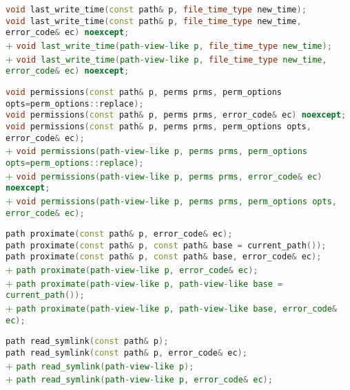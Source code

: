 \documentclass[11pt]{article}
\newcommand{\code}[2][cpp]{\lstinline[language=#1,basicstyle=\small\ttfamily]{#2}}
\newcommand{\tsreplace}[3]{\textcolor{red}{\sout{#1}}#2\textcolor{darkgreen}{#3}}
\begin{document}
\tsreplace{}{  \code{void last_write_time(const path& p, file_time_type new_time);}}{}\\
\tsreplace{}{  \code{void last_write_time(const path& p, file_time_type new_time, error_code& ec) noexcept;}}{}\\
\tsreplace{}{}{+ \code{void last_write_time(path-view-like p, file_time_type new_time);}}\\
\tsreplace{}{}{+ \code{void last_write_time(path-view-like p, file_time_type new_time, error_code& ec) noexcept;}}

\tsreplace{}{  \code{void permissions(const path& p, perms prms, perm_options opts=perm_options::replace);}}{}\\
\tsreplace{}{  \code{void permissions(const path& p, perms prms, error_code& ec) noexcept;}}{}\\
\tsreplace{}{  \code{void permissions(const path& p, perms prms, perm_options opts, error_code& ec);}}{}\\
\tsreplace{}{}{+ \code{void permissions(path-view-like p, perms prms, perm_options opts=perm_options::replace);}}\\
\tsreplace{}{}{+ \code{void permissions(path-view-like p, perms prms, error_code& ec) noexcept;}}\\
\tsreplace{}{}{+ \code{void permissions(path-view-like p, perms prms, perm_options opts, error_code& ec);}}

\tsreplace{}{  \code{path proximate(const path& p, error_code& ec);}}{}\\
\tsreplace{}{  \code{path proximate(const path& p, const path& base = current_path());}}{}\\
\tsreplace{}{  \code{path proximate(const path& p, const path& base, error_code& ec);}}{}\\
\tsreplace{}{}{+ \code{path proximate(path-view-like p, error_code& ec);}}\\
\tsreplace{}{}{+ \code{path proximate(path-view-like p, path-view-like base = current_path());}}\\
\tsreplace{}{}{+ \code{path proximate(path-view-like p, path-view-like base, error_code& ec);}}

\tsreplace{}{  \code{path read_symlink(const path& p);}}{}\\
\tsreplace{}{  \code{path read_symlink(const path& p, error_code& ec);}}{}\\
\tsreplace{}{}{+ \code{path read_symlink(path-view-like p);}}\\
\tsreplace{}{}{+ \code{path read_symlink(path-view-like p, error_code& ec);}}
\end{document}
